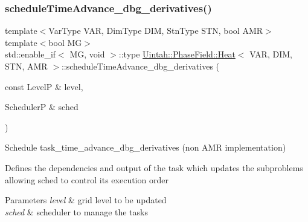 \subsubsection{\texorpdfstring{schedule\+Time\+Advance\+\_\+dbg\+\_\+derivatives()}{scheduleTimeAdvance\_dbg\_derivatives()}\hspace{0.1cm}{\footnotesize\ttfamily [1/2]}}
{\footnotesize\ttfamily template$<$Var\+Type V\+AR, Dim\+Type D\+IM, Stn\+Type S\+TN, bool A\+MR$>$ \\
template$<$bool MG$>$ \\
std\+::enable\+\_\+if$<$ MG, void $>$\+::type \hyperlink{classUintah_1_1PhaseField_1_1Heat}{Uintah\+::\+Phase\+Field\+::\+Heat}$<$ V\+AR, D\+IM, S\+TN, A\+MR $>$\+::schedule\+Time\+Advance\+\_\+dbg\+\_\+derivatives (\begin{DoxyParamCaption}\item[{const LevelP \&}]{level,  }\item[{SchedulerP \&}]{sched }\end{DoxyParamCaption})\hspace{0.3cm}{\ttfamily [protected]}}



Schedule task\+\_\+time\+\_\+advance\+\_\+dbg\+\_\+derivatives (non A\+MR implementation) 

Defines the dependencies and output of the task which updates the subproblems allowing sched to control its execution order


\begin{DoxyParams}{Parameters}
{\em level} & grid level to be updated \\
\hline
{\em sched} & scheduler to manage the tasks \\
\hline
\end{DoxyParams}
\mbox{\label{classUintah_1_1PhaseField_1_1Heat_a4050259130c6c4b8fa97ec69cd646067}} 
